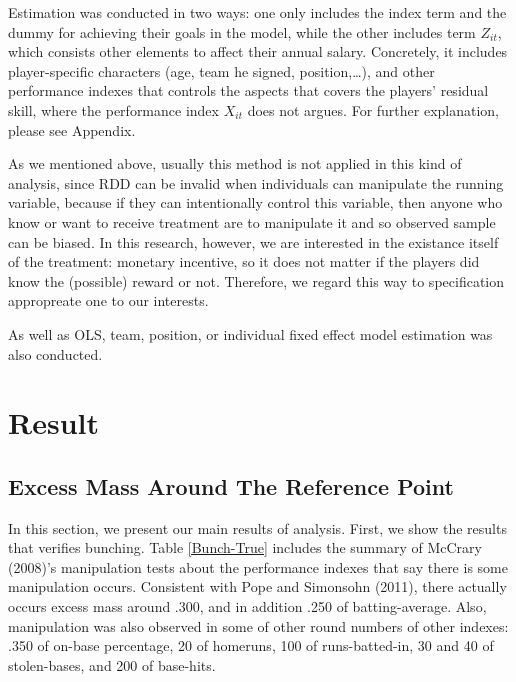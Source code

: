 \documentclass[dvipdfmx, 12pt]{article}
\begin{document}
  Estimation was conducted in two ways: one only includes the index term and the dummy for achieving their goals in the model, while the other includes term $Z_{it}$, which consists other elements to affect their annual salary. Concretely, it includes player-specific characters (age, team he signed, position,\ldots), and other performance indexes that controls the aspects that covers the players' residual skill, where the performance index $X_{it}$ does not argues. For further explanation, please see Appendix.

  As we mentioned above, usually this method is not applied in this kind of analysis, since RDD can be invalid when individuals can manipulate the running variable, because if they can intentionally control this variable, then anyone who know or want to receive treatment are to manipulate it and so observed sample can be biased. In this research, however, we are interested in the existance itself of the treatment: monetary incentive, so it does not matter if the players did know the (possible) reward or not. Therefore, we regard this way to specification appropreate one to our interests.

  As well as OLS, team, position, or individual fixed effect model estimation was also conducted.


\section{Result}
\subsection{Excess Mass Around The Reference Point}

In this section, we present our main results of analysis. First, we show the results that verifies bunching. Table \ref{Bunch-True} includes the summary of McCrary (2008)'s manipulation tests about the performance indexes that say there is some manipulation occurs. Consistent with Pope and Simonsohn (2011), there actually occurs excess mass around .300, and in addition .250 of batting-average. Also, manipulation was also observed in some of other round numbers of other indexes: .350 of on-base percentage, 20 of homeruns, 100 of runs-batted-in, 30 and 40 of stolen-bases, and 200 of base-hits.
\end{document}
